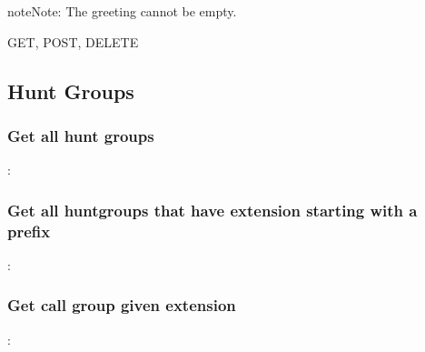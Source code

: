 \documentclass[letterpaper,10pt,english]{sphinxmanual}
\begin{document}
\begin{sphinxadmonition}{note}{Note:}
The greeting cannot be empty.
\end{sphinxadmonition}

 GET, POST, DELETE


\subsection{Hunt Groups}
\label{\detokenize{restapi:hunt-groups}}

\subsubsection{Get all hunt groups}
\label{\detokenize{restapi:get-all-hunt-groups}}
:

\begin{sphinxVerbatim}[commandchars=\\\{\}]
     
\end{sphinxVerbatim}


\subsubsection{Get all huntgroups that have extension starting with a prefix}
\label{\detokenize{restapi:get-all-huntgroups-that-have-extension-starting-with-a-prefix}}
:

\begin{sphinxVerbatim}[commandchars=\\\{\}]
     
\end{sphinxVerbatim}


\subsubsection{Get call group given extension}
\label{\detokenize{restapi:get-call-group-given-extension}}
:
\end{document}
